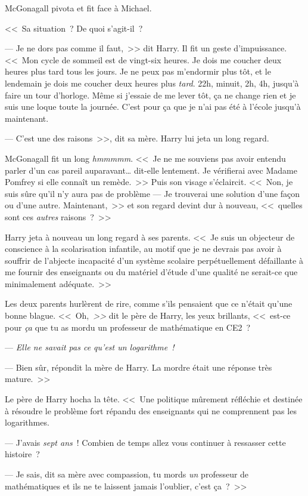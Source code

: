 McGonagall pivota et fit face à Michael.

<<~Sa situation~? De quoi s'agit-il~?

--- Je ne dors pas comme il faut,~>> dit Harry. Il fit un geste d'impuissance. <<~Mon cycle de sommeil est de vingt-six heures. Je dois me coucher deux heures plus tard tous les jours. Je ne peux pas m'endormir plus tôt, et le lendemain je dois me coucher deux heures plus \emph{tard}. 22h, minuit, 2h, 4h, jusqu'à faire un tour d'horloge. Même si j'essaie de me lever tôt, ça ne change rien et je suis une loque toute la journée. C'est pour ça que je n'ai pas été à l'école jusqu'à maintenant.

--- C'est une des raisons~>>, dit sa mère. Harry lui jeta un long regard.

McGonagall fit un long \emph{hmmmmm}. <<~Je ne me souviens pas avoir entendu parler d'un cas pareil auparavant… dit-elle lentement. Je vérifierai avec Madame Pomfrey si elle connaît un remède.~>> Puis son visage s'éclaircit. <<~Non, je suis sûre qu'il n'y aura pas de problème — Je trouverai une solution d'une façon ou d'une autre. Maintenant,~>> et son regard devint dur à nouveau, <<~quelles sont ces \emph{autres} raisons~?~>>

Harry jeta à nouveau un long regard à ses parents. <<~Je suis un objecteur de conscience à la scolarisation infantile, au motif que je ne devrais pas avoir à souffrir de l'abjecte incapacité d'un système scolaire perpétuellement défaillante à me fournir des enseignants ou du matériel d'étude d'une qualité ne serait-ce que minimalement adéquate.~>>

Les deux parents hurlèrent de rire, comme s'ils pensaient que ce n'était qu'une bonne blague. <<~Oh,\emph{~>>} dit le père de Harry, les yeux brillants, <<~est-ce pour \emph{ça} que tu as mordu un professeur de mathématique en CE2~?

--- \emph{Elle ne savait pas ce qu'est un logarithme~!}

--- Bien sûr, répondit la mère de Harry. La mordre était une réponse très mature.~>>

Le père de Harry hocha la tête. <<~Une politique mûrement réfléchie et destinée à résoudre le problème fort répandu des enseignants qui ne comprennent pas les logarithmes.

--- J'avais \emph{sept ans}~! Combien de temps allez vous continuer à ressasser cette histoire~?

--- Je sais, dit sa mère avec compassion, tu mords \emph{un} professeur de mathématiques et ils ne te laissent jamais l'oublier, c'est ça~?~>>

